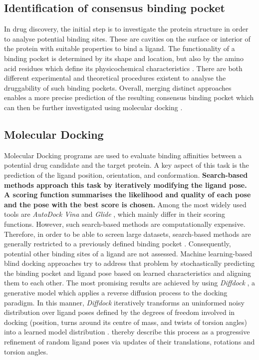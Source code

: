 \documentclass[11pt, letterpaper, titlepage]{article}
\renewcommand{\cite}{\parencite}
\begin{document}
\subsection{Identification of consensus binding pocket}
In drug discovery, the initial step is to investigate the protein structure in order to analyse potential binding sites. These are cavities on the surface or interior of the protein with suitable properties to bind a ligand. The functionality of a binding pocket is determined by its shape and location, but also by the amino acid residues which define its physicochemical characteristics \cite{Stank_2016}. 
There are both different experimental and theoretical procedures existent to analyse the druggability of such binding pockets. Overall, merging distinct approaches enables a more precise prediction of the resulting consensus binding pocket which can then be further investigated using molecular docking \cite{Ricci_2022}. 


\subsection{Molecular Docking}
Molecular Docking programs are used to evaluate binding affinities between a potential drug candidate and the target protein. A key aspect of this task is the prediction of the ligand position, orientation, and conformation. \textbf{Search-based methods approach this task by iteratively modifying the ligand pose. A scoring function summarises the likelihood and quality of each pose and the pose with the best score is chosen.} Among the most widely used tools are \textit{AutoDock Vina} \cite{Trott.2010} and \textit{Glide} \cite{Halgren.2004}, which mainly differ in their scoring functions. However, such search-based methods are computationally expensive. Therefore, in order to be able to screen large datasets, search-based methods are generally restricted to a previously defined binding pocket \cite{Corso.2022}. Consequently, potential other binding sites of a ligand are not assessed. Machine learning-based blind docking approaches try to address that problem by stochastically predicting the binding pocket and ligand pose based on learned characteristics and aligning them to each other. The most promising results are achieved by using \textit{Diffdock} \cite{Corso.2022}, a generative model which applies a reverse diffusion process to the docking paradigm. In this manner, \textit{Diffdock} iteratively transforms an uninformed noisy distribution over ligand poses defined by the degrees of freedom involved in docking (position, turns around its centre of mass, and twists of torsion angles) into a learned model distribution \cite{Corso.2022}. \citeauthor{Corso.2022} thereby describe this process as a progressive refinement of random ligand poses via updates of their translations, rotations and torsion angles.
\end{document}
